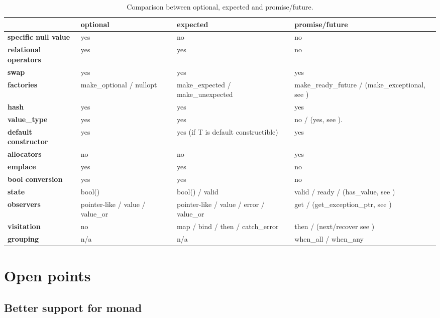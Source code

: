 \documentclass[a4paper,10pt]{article}
\begin{document}
\begin{table}
\bgroup
\def\arraystretch{1.5}
\begin{tabular}{|l|>{\raggedright\arraybackslash}p{4cm}|>{\raggedright\arraybackslash}p{4cm}|>{\raggedright\arraybackslash}p{4cm}|}
\hline
                    & \textbf{optional} & \textbf{expected} & \textbf{promise/future} \\
\hline
\textbf{specific null value} & yes & no & no \\
\hline
\textbf{relational operators} & yes & yes & no \\
\hline
\textbf{swap} & yes & yes & yes \\
\hline
\textbf{factories} & make_optional / nullopt & make_expected / make_unexpected & make_ready_future / (make_exceptional, see \cite{MoreAsync}) \\
\hline
\textbf{hash} & yes & yes & yes \\
\hline
\textbf{value_type} & yes & yes & no / (yes, see \cite{MoreAsync}).  \\
\hline
\textbf{default constructor} & yes & yes (if T is default constructible) & yes \\
\hline
\textbf{allocators} & no & no & yes \\
\hline
\textbf{emplace} & yes & yes & no \\
\hline
\textbf{bool conversion} & yes & yes & no \\
\hline
\textbf{state} & bool()  &  bool() / valid & valid / ready / (has_value, see \cite{MoreAsync}) \\
\hline
\textbf{observers} & pointer-like / value / value_or & pointer-like / value / error / value_or  & get / (get_exception_ptr, see \cite{MoreAsync}) \\
\hline
\textbf{visitation} & no & map / bind / then / catch_error  & then / (next/recover see \cite{MoreAsync}) \\
\hline
\textbf{grouping} & n/a & n/a & when_all / when_any \\
\hline
\end{tabular}
\egroup
\caption{Comparison between optional, expected and promise/future.}
\label{comp-monads}
\end{table}

\section{Open points}

\subsection{Better support for monad}
\label{better-support-for-monad}
\end{document}
